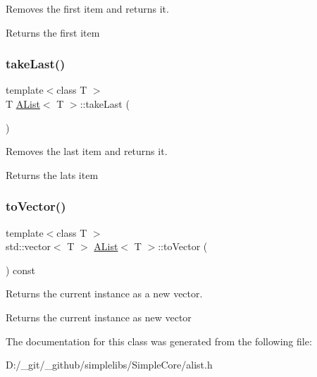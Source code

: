 Removes the first item and returns it. 

\begin{DoxyReturn}{Returns}
the first item 
\end{DoxyReturn}
\mbox{\label{class_a_list_aa210fddef3bf64dd63dd68f3d5f2fe05}} 
\subsubsection{\texorpdfstring{takeLast()}{takeLast()}}
{\footnotesize\ttfamily template$<$class T $>$ \\
T \mbox{\hyperlink{class_a_list}{A\+List}}$<$ T $>$\+::take\+Last (\begin{DoxyParamCaption}{ }\end{DoxyParamCaption})}



Removes the last item and returns it. 

\begin{DoxyReturn}{Returns}
the lats item 
\end{DoxyReturn}
\mbox{\label{class_a_list_a6e1a3cea40a3046c16643680e8581552}} 
\subsubsection{\texorpdfstring{toVector()}{toVector()}}
{\footnotesize\ttfamily template$<$class T $>$ \\
std\+::vector$<$ T $>$ \mbox{\hyperlink{class_a_list}{A\+List}}$<$ T $>$\+::to\+Vector (\begin{DoxyParamCaption}{ }\end{DoxyParamCaption}) const}



Returns the current instance as a new vector. 

\begin{DoxyReturn}{Returns}
the current instance as new vector 
\end{DoxyReturn}


The documentation for this class was generated from the following file\+:\begin{DoxyCompactItemize}
\item 
D\+:/\+\_\+git/\+\_\+github/simplelibs/\+Simple\+Core/alist.\+h\end{DoxyCompactItemize}
